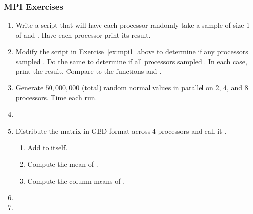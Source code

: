 \begin{frame}[allowframebreaks=.9]
\frametitle{MPI Exercises}
\begin{enumerate}
  \item Write a script that will have each processor randomly take a sample of
        size 1 of  and . Have each processor print its
        result.\label{ex:mpi1}

  \item Modify the script in Exercise~\ref{ex:mpi1} above to determine if any
  processors sampled . Do the same to determine if all processors 
  sampled . In each case, print the result. Compare to the functions 
   and .
  
  \item Generate $50,000,000$ (total) random normal values in parallel on 2, 4, and 8 processors.  Time each run.
  
  \item 
  
  
  \item Distribute the matrix  in GBD format across 4 processors and call it .  
  \begin{enumerate}
    \item Add  to itself.
    \item Compute the mean of .
    \item Compute the column means of .
  \end{enumerate}
  
  \item 
  
  \item
\end{enumerate}
\end{frame}